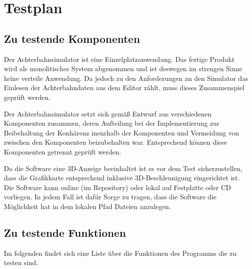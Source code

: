 
\chapter{Testplan}


\section{Zu testende Komponenten}
Der Achterbahnsimulator ist eine Einzelplatzanwendung. Das fertige Produkt wird als monolitisches System abgenommen und ist deswegen im strengen Sinne keine verteile Anwendung. Da jedoch zu den Anforderungen an den Simulator das Einlesen der Achterbahndaten aus dem Editor zählt, muss dieses Zusammenspiel geprüft werden.

Der Achterbahnsimulator setzt sich gemäß Entwurf aus verschiedenen Komponenten zusammen, deren Aufteilung bei der Implementierung zur Beibehaltung der Konhärenz inenrhalb der Komponenten und Vermeidung von zwischen den Komponenten beizubehalten war.
Entsprechend können diese Komponenten getrennt geprüft werden. 

Da die Software eine 3D-Anzeige beeinhaltet ist es vor dem Test sicherzustellen, dass die Grafikkarte entsprechend inklusive 3D-Beschleunigung eingerichtet ist.
Die Software kann online (im Repository) oder lokal auf Festplatte oder CD vorliegen. In jedem Fall ist dafür Sorge zu tragen, dass die Software die Möglichkeit hat in dem lokalen Pfad Dateien anzulegen.

\section{Zu testende Funktionen}
Im folgenden findet sich eine Liste über die Funktionen des Programms die zu testen sind. 

